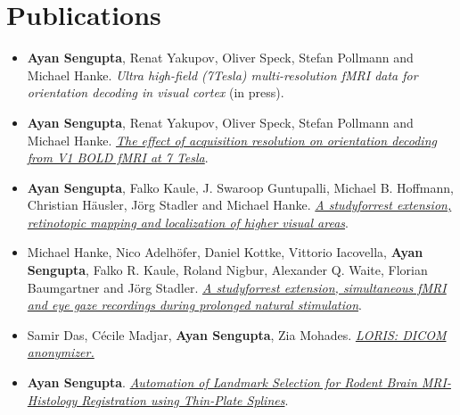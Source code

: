 \documentclass[line, margin]{res}
\begin{document}
\begin{resume}
\begin{itemize}
 
\end{itemize}




\section{Publications}
\begin{itemize}
    \item \textbf{Ayan Sengupta}, Renat Yakupov, Oliver Speck, Stefan Pollmann and Michael Hanke. \textit{Ultra high-field (7Tesla) multi-resolution fMRI data for orientation decoding in visual cortex} (in press).\\
    \item \textbf{Ayan Sengupta}, Renat Yakupov, Oliver Speck, Stefan Pollmann and Michael Hanke. \href{http://www.sciencedirect.com/science/article/pii/S1053811916307625}{\textit{The effect of acquisition resolution on orientation decoding from V1 BOLD fMRI at 7 Tesla}}.\\
    \item \textbf{Ayan Sengupta}, Falko Kaule, J. Swaroop Guntupalli, Michael B. Hoffmann, Christian H\"{a}usler, J\"{o}rg Stadler and Michael Hanke. \href{http://www.nature.com/articles/sdata201693}{\textit{A studyforrest extension, retinotopic mapping and localization of higher visual areas}}.\\
    \item Michael Hanke,  Nico Adelh\"{o}fer, Daniel Kottke, Vittorio Iacovella, \textbf{Ayan Sengupta}, Falko R. Kaule, Roland Nigbur, Alexander Q. Waite, Florian Baumgartner and J\"{o}rg Stadler. \href{http://www.nature.com/articles/sdata201692}{\textit{A studyforrest extension, simultaneous fMRI and eye gaze recordings during prolonged natural stimulation}}.\\
	\item Samir Das, C\'{e}cile Madjar, \textbf{Ayan Sengupta}, Zia Mohades. \href{https://www.ncbi.nlm.nih.gov/pmc/articles/PMC5103253}{\textit{LORIS: DICOM anonymizer.}}\\
	\item \textbf{Ayan Sengupta}. \href{http://digitalcommons.unl.edu/computerscidiss/45/}{\textit{Automation of Landmark Selection for Rodent Brain MRI-Histology Registration using Thin-Plate Splines}}.\\
\end{itemize}





\end{resume}
\end{document}
